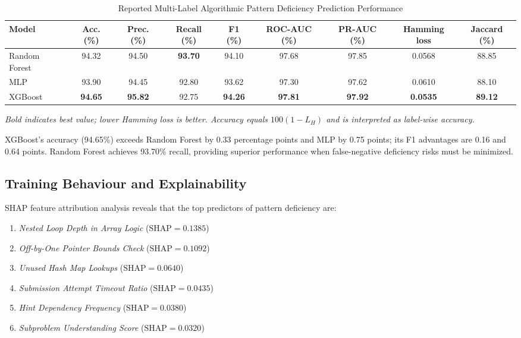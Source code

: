 \documentclass[conference]{IEEEtran}
\begin{document}
\begin{table}[t]
\centering
\caption{Reported Multi-Label Algorithmic Pattern Deficiency Prediction Performance}
\label{tab:model_performance}
\begin{tabular}{lcccccccc}
\toprule
\textbf{Model} & \textbf{Acc. (\%)} & \textbf{Prec. (\%)} & \textbf{Recall (\%)} & \textbf{F1 (\%)} & \textbf{ROC-AUC (\%)} & \textbf{PR-AUC (\%)} & \textbf{Hamming loss} & \textbf{Jaccard (\%)} \\
\midrule
Random Forest & 94.32 & 94.50 & \textbf{93.70} & 94.10 & 97.68 & 97.85 & 0.0568 & 88.85 \\
MLP & 93.90 & 94.45 & 92.80 & 93.62 & 97.30 & 97.62 & 0.0610 & 88.10 \\
XGBoost & \textbf{94.65} & \textbf{95.82} & 92.75 & \textbf{94.26} & \textbf{97.81} & \textbf{97.92} & \textbf{0.0535} & \textbf{89.12} \\
\bottomrule
\end{tabular}
\begin{flushleft}
\small{\textit{Bold indicates best value; lower Hamming loss is better. Accuracy equals $100(1 - L_H)$ and is interpreted as label-wise accuracy.}}
\end{flushleft}
\end{table}

XGBoost's accuracy (94.65\%) exceeds Random Forest by 0.33 percentage points and MLP by 0.75 points; its F1 advantages are 0.16 and 0.64 points. Random Forest achieves 93.70\% recall, providing superior performance when false-negative deficiency risks must be minimized.

\subsection{Training Behaviour and Explainability}
SHAP feature attribution analysis reveals that the top predictors of pattern deficiency are:
\begin{enumerate}
    \item \textit{Nested Loop Depth in Array Logic} ($\text{SHAP} = 0.1385$)
    \item \textit{Off-by-One Pointer Bounds Check} ($\text{SHAP} = 0.1092$)
    \item \textit{Unused Hash Map Lookups} ($\text{SHAP} = 0.0640$)
    \item \textit{Submission Attempt Timeout Ratio} ($\text{SHAP} = 0.0435$)
    \item \textit{Hint Dependency Frequency} ($\text{SHAP} = 0.0380$)
    \item \textit{Subproblem Understanding Score} ($\text{SHAP} = 0.0320$)
\end{enumerate}
\end{document}
